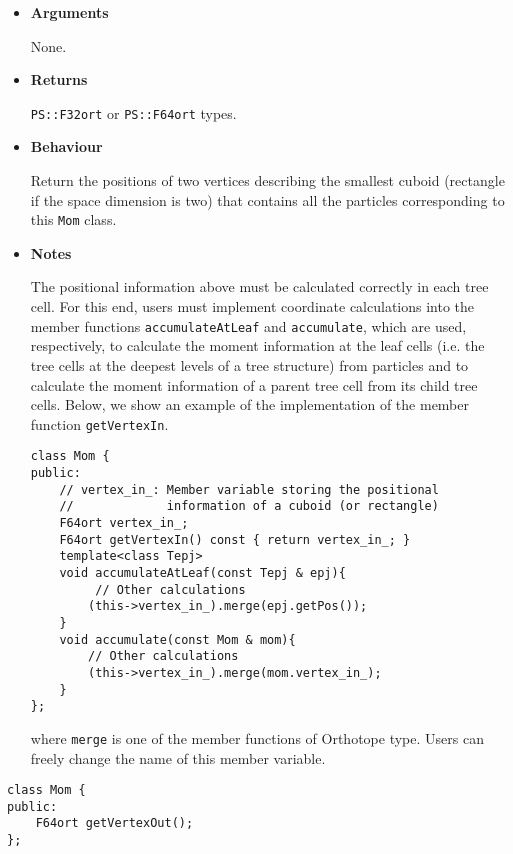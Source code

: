 \begin{itemize}

\item {\bf Arguments}

None.
  
\item {\bf Returns}

\texttt{PS::F32ort} or \texttt{PS::F64ort} types.

\item {\bf Behaviour}

  Return the positions of two vertices describing the smallest cuboid (rectangle if the space dimension is two) that contains all the particles corresponding to this \texttt{Mom} class.

\item {\bf Notes}

The positional information above must be calculated correctly in each tree cell. For this end, users must implement coordinate calculations into the member functions \texttt{accumulateAtLeaf} and \texttt{accumulate}, which are used, respectively, to calculate the moment information at the leaf cells (i.e. the tree cells at the deepest levels of a tree structure) from particles and to calculate the moment information of a parent tree cell from its child tree cells. Below, we show an example of the implementation of the member function \texttt{getVertexIn}.
  
\begin{screen}
\begin{verbatim}
class Mom {
public:
    // vertex_in_: Member variable storing the positional
    //             information of a cuboid (or rectangle)
    F64ort vertex_in_; 
    F64ort getVertexIn() const { return vertex_in_; }
    template<class Tepj>
    void accumulateAtLeaf(const Tepj & epj){ 
         // Other calculations
        (this->vertex_in_).merge(epj.getPos());
    }
    void accumulate(const Mom & mom){
        // Other calculations
        (this->vertex_in_).merge(mom.vertex_in_);
    }
};
\end{verbatim}
\end{screen}
where \texttt{merge} is one of the member functions of Orthotope type.
Users can freely change the name of this member variable.
  
\end{itemize}


\begin{screen}
\begin{verbatim}
class Mom {
public:
    F64ort getVertexOut();
};
\end{verbatim}
\end{screen}

